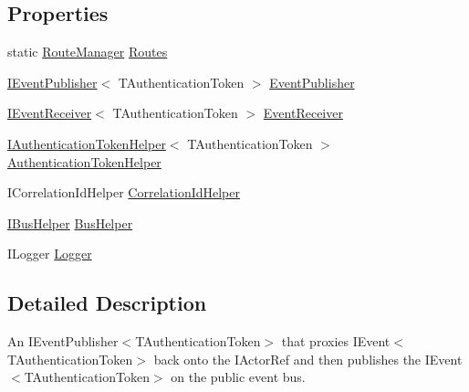 \subsection*{Properties}
\begin{DoxyCompactItemize}
\item 
static \hyperlink{classCqrs_1_1Bus_1_1RouteManager}{Route\+Manager} \hyperlink{classCqrs_1_1Akka_1_1Events_1_1AkkaEventBus_a22f195a654564335ffa5f6df01b8af8d}{Routes}
\item 
\hyperlink{interfaceCqrs_1_1Events_1_1IEventPublisher}{I\+Event\+Publisher}$<$ T\+Authentication\+Token $>$ \hyperlink{classCqrs_1_1Akka_1_1Events_1_1AkkaEventBus_a763ef1bf4f3d48ad066a38e576e2d7f0}{Event\+Publisher}
\item 
\hyperlink{interfaceCqrs_1_1Events_1_1IEventReceiver}{I\+Event\+Receiver}$<$ T\+Authentication\+Token $>$ \hyperlink{classCqrs_1_1Akka_1_1Events_1_1AkkaEventBus_a8e2deeb33b6c6cbc59bec0e0786d5b71}{Event\+Receiver}
\item 
\hyperlink{interfaceCqrs_1_1Authentication_1_1IAuthenticationTokenHelper}{I\+Authentication\+Token\+Helper}$<$ T\+Authentication\+Token $>$ \hyperlink{classCqrs_1_1Akka_1_1Events_1_1AkkaEventBus_a03166dfca723430ae548e833a2262632}{Authentication\+Token\+Helper}
\item 
I\+Correlation\+Id\+Helper \hyperlink{classCqrs_1_1Akka_1_1Events_1_1AkkaEventBus_a5a0e9b6c2c2c5bccb917afabddbee1a8}{Correlation\+Id\+Helper}
\item 
\hyperlink{interfaceCqrs_1_1Bus_1_1IBusHelper}{I\+Bus\+Helper} \hyperlink{classCqrs_1_1Akka_1_1Events_1_1AkkaEventBus_a04311f852422c212c4dfa35e8cc21e2e}{Bus\+Helper}
\item 
I\+Logger \hyperlink{classCqrs_1_1Akka_1_1Events_1_1AkkaEventBus_a0bbdde7f2011707581db6a66cd73c5c4}{Logger}
\end{DoxyCompactItemize}


\subsection{Detailed Description}
An I\+Event\+Publisher$<$\+T\+Authentication\+Token$>$ that proxies I\+Event$<$\+T\+Authentication\+Token$>$ back onto the I\+Actor\+Ref and then publishes the I\+Event$<$\+T\+Authentication\+Token$>$ on the public event bus. 



